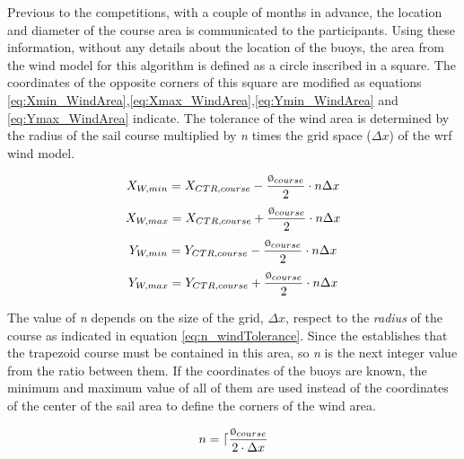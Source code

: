 Previous to the competitions, with a couple of months in advance, the location and diameter of the course area is communicated to the participants. Using these information, without any details about the location of the buoys, the area from the wind model for this algorithm is defined as a circle inscribed in a square. The coordinates of the opposite corners of this square are modified as equations \ref{eq:Xmin_WindArea},\ref{eq:Xmax_WindArea},\ref{eq:Ymin_WindArea} and \ref{eq:Ymax_WindArea} indicate. The tolerance of the wind area is determined by the radius of the sail course multiplied by \textit{n} times the grid space  ($\Delta x$) of the \acrshort{wrf} wind model. \par
\begin{equation} \label{eq:Xmin_WindArea}
    X_{W,min}= X_{CTR,course}-\frac{\clock_{course}}{2} \cdot n \Delta x
\end{equation}
\begin{equation} \label{eq:Xmax_WindArea}
    X_{W,max}= X_{CTR,course} + \frac{\clock_{course}}{2} \cdot n \Delta x
\end{equation}
\begin{equation} \label{eq:Ymin_WindArea}
    Y_{W,min}= Y_{CTR,course}-\frac{\clock_{course}}{2} \cdot n \Delta x
\end{equation}
\begin{equation} \label{eq:Ymax_WindArea}
    Y_{W,max}= Y_{CTR,course} + \frac{\clock_{course}}{2} \cdot  n \Delta x
\end{equation}

The value of \textit{n} depends on the size of the grid, $\Delta x $, respect to the \textit{radius} of the course as indicated in equation \ref{eq:n_windTolerance}. Since the  \cite{race_pol2017} establishes that the trapezoid course must be contained in this area, so \textit{n} is the next integer value from the ratio between them. If the coordinates of the buoys are known, the minimum and maximum value of all of them are used instead of the coordinates of the center of the sail area to define the corners of the wind area. \par %
\begin{equation} \label{eq:n_windTolerance}
    n=\lceil \frac{\clock_{course}}{2 \cdot \Delta x}
\end{equation}

